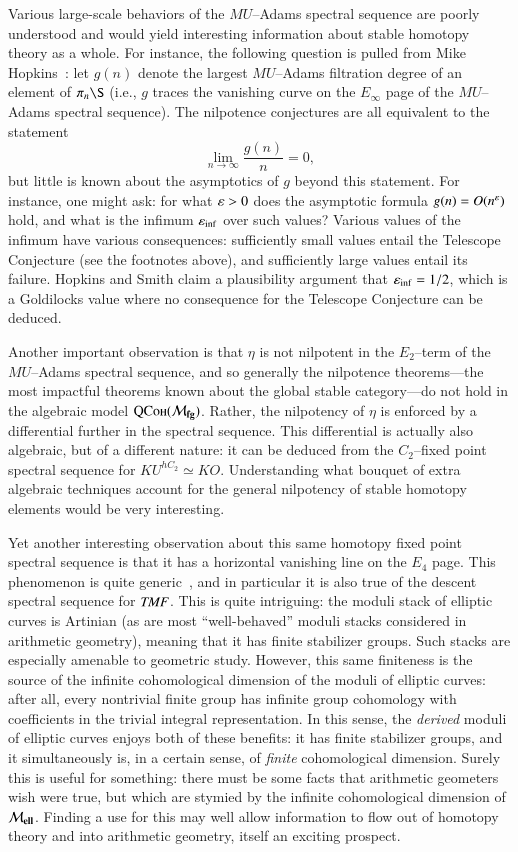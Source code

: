 Various large-scale behaviors of the $MU$--Adams spectral sequence are poorly understood and would yield interesting information about stable homotopy theory as a whole.  For instance, the following question is pulled from Mike Hopkins~\cite[Section 10]{HopkinsOnRavenel}: let $g(n)$ denote the largest $MU$--Adams filtration degree of an element of $\pi_n \S$ (i.e., $g$ traces the vanishing curve on the $E_\infty$ page of the $MU$--Adams spectral sequence).  The nilpotence conjectures are all equivalent to the statement \[\lim_{n \to \infty} \frac{g(n)}{n} = 0,\] but little is known about the asymptotics of $g$ beyond this statement.  For instance, one might ask: for what $\varepsilon > 0$ does the asymptotic formula $g(n) = O(n^{\varepsilon})$ hold, and what is the infimum $\varepsilon_{\inf}$ over such values?  Various values of the infimum have various consequences: sufficiently small values entail the Telescope Conjecture (see the footnotes above), and sufficiently large values entail its failure.  Hopkins and Smith claim a plausibility argument that $\varepsilon_{\inf} = 1/2$, which is a Goldilocks value where no consequence for the Telescope Conjecture can be deduced.

Another important observation is that $\eta$ is not nilpotent in the $E_2$--term of the $MU$--Adams spectral sequence, and so generally the nilpotence theorems---the most impactful theorems known about the global stable category---do not hold in the algebraic model $\normalfont\textsc{QCoh}(\mathcal{M}_{\mathbf{fg}})$.  Rather, the nilpotency of $\eta$ is enforced by a differential further in the spectral sequence.  This differential is actually also algebraic, but of a different nature: it can be deduced from the $C_2$--fixed point spectral sequence for $KU^{hC_2} \simeq KO$.  Understanding what bouquet of extra algebraic techniques account for the general nilpotency of stable homotopy elements would be very interesting.

Yet another interesting observation about this same homotopy fixed point spectral sequence is that it has a horizontal vanishing line on the $E_4$ page.  This phenomenon is quite generic~\cite{MathewMeier}, and in particular it is also true of the descent spectral sequence for $\mathit{TMF}$.  This is quite intriguing: the moduli stack of elliptic curves is Artinian (as are most ``well-behaved'' moduli stacks considered in arithmetic geometry), meaning that it has finite stabilizer groups.  Such stacks are especially amenable to geometric study.  However, this same finiteness is the source of the infinite cohomological dimension of the moduli of elliptic curves: after all, every nontrivial finite group has infinite group cohomology with coefficients in the trivial integral representation.  In this sense, the \emph{derived} moduli of elliptic curves enjoys both of these benefits: it has finite stabilizer groups, and it simultaneously is, in a certain sense, of \emph{finite} cohomological dimension.  Surely this is useful for something: there must be some facts that arithmetic geometers wish were true, but which are stymied by the infinite cohomological dimension of $\mathcal{M}_{\mathbf{ell}}$.  Finding a use for this may well allow information to flow out of homotopy theory and into arithmetic geometry, itself an exciting prospect.

